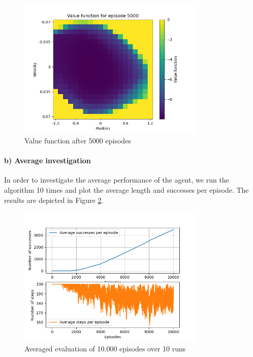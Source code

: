 \documentclass{article}
\begin{document}
\begin{figure}[H]
    \centering
    \includegraphics[width=0.8\textwidth]{images/document/value_function_episode5000.png}
    \caption{Value function after 5000 episodes}
    \label{fig:V3}
\end{figure}



\paragraph*{b) Average investigation}

In order to investigate the average performance of the agent, we run the algorithm 10 times and plot the average length and successes per episode. The results are depicted in Figure \ref{fig:average}.

\begin{figure}[H]
\centering
\includegraphics[width=0.8\textwidth]{images/document/repeated_training_investigation.png}
\caption{Averaged evaluation of 10.000 episodes over 10 runs}
\label{fig:average}
\end{figure}
\end{document}
